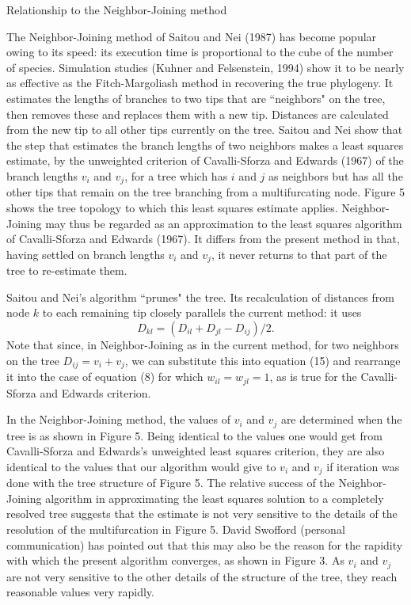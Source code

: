 \documentclass[12pt]{article}
\begin{document}
\centerline{\sc Relationship to the Neighbor-Joining method}
\bigskip

The Neighbor-Joining method of Saitou and Nei (1987) has become popular owing
to its speed: its execution time is proportional to the cube of the number
of species.  Simulation studies
(Kuhner and Felsenstein, 1994) show it to be nearly as effective as the
Fitch-Margoliash method in recovering the true phylogeny.
It estimates the lengths of branches to two tips that are ``neighbors" on the
tree, then removes these and replaces them with a new tip.  Distances
are calculated from the new tip to all other tips currently on the tree.
Saitou and Nei show that the step that estimates the branch lengths of two
neighbors makes a least squares estimate, by the unweighted criterion
of Cavalli-Sforza and Edwards (1967) of the branch lengths $v_i$ and $v_j$,
for a tree which has $i$ and $j$ as neighbors but has all the other tips that
remain on the tree branching from a multifurcating node.  Figure 5 shows the
tree topology to which this least squares estimate applies.  Neighbor-Joining
may thus be regarded as an approximation to the least squares
algorithm of Cavalli-Sforza and Edwards (1967).  It differs from the present
method in that, having settled on branch lengths $v_i$ and $v_j$, it
never returns to that part of the tree to re-estimate them.

Saitou and Nei's algorithm ``prunes" the tree.  Its recalculation of
distances from node $k$ to each remaining tip closely parallels the current
method: it uses
\begin{equation} %
D_{kl} = (D_{il} + D_{jl} - D_{ij})\big/ 2.
\end{equation}
\noindent
Note that since, in Neighbor-Joining as in the current method, for two
neighbors on the tree $D_{ij} = v_i + v_j$, we can substitute this into
equation (15) and rearrange it into the case of equation (8) for which
$w_{il} = w_{jl} = 1$, as is true for the Cavalli-Sforza and Edwards
criterion.

In the Neighbor-Joining method,
the values of $v_i$ and $v_j$ are determined when the tree is as shown in
Figure 5.  Being identical to the values one would get from Cavalli-Sforza
and Edwards's unweighted least squares criterion, they are also identical to
the values that our algorithm would give to $v_i$ and $v_j$ if
iteration was done with the tree structure of Figure 5.  The relative
success of the Neighbor-Joining algorithm in approximating the least squares
solution to a completely resolved tree suggests that the estimate
is not very sensitive to the details of the resolution of the multifurcation
in Figure 5.  David Swofford (personal communication) has pointed out that
this may also be the
reason for the rapidity with which the present algorithm converges, as
shown in Figure 3.  As $v_i$ and $v_j$ are not very sensitive to the
other details of the structure of the tree, they reach reasonable values
very rapidly.
\end{document}
